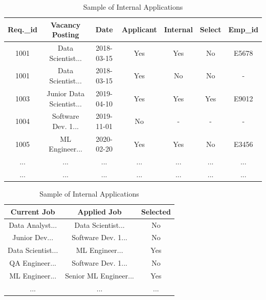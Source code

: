 \documentclass[12pt]{article}
\begin{document}
\begin{table}[ht]
\centering
\small
\caption{Sample of Internal Job Postings Data}
\label{tab:job_postings}
\begin{tabular}{|c|c|c|c|c|c|c|}
\hline
Req.\_id & Vacancy Posting & Date & Applicant & Internal & Select & Emp\_id \\
\hline
1001 & Data Scientist... & 2018-03-15 & Yes & Yes & No & E5678 \\
1001 & Data Scientist... & 2018-03-15 & Yes & No & No & - \\
1003 & Junior Data Scientist... & 2019-04-10 & Yes & Yes & Yes & E9012 \\
1004 & Software Dev. 1... & 2019-11-01 & No & - & - & - \\
1005 & ML Engineer... & 2020-02-20 & Yes & Yes & No & E3456 \\
\multicolumn{1}{|c|}{...} & \multicolumn{1}{c|}{...} & \multicolumn{1}{c|}{...} & \multicolumn{1}{c|}{...} & \multicolumn{1}{c|}{...} & \multicolumn{1}{c|}{...} & \multicolumn{1}{c|}{...} \\
\multicolumn{1}{|c|}{...} & \multicolumn{1}{c|}{...} & \multicolumn{1}{c|}{...} & \multicolumn{1}{c|}{...} & \multicolumn{1}{c|}{...} & \multicolumn{1}{c|}{...} & \multicolumn{1}{c|}{...} \\
\hline
\end{tabular}
\vspace{0.5cm}
\caption{Sample of Internal Applications}
\label{tab:job_transitions}
\begin{tabular}{|c|c|c|}
\hline
Current Job & Applied Job & Selected \\
\hline
Data Analyst... & Data Scientist... & No \\
Junior Dev... & Software Dev. 1... & No \\
Data Scientist... & ML Engineer... & Yes \\
QA Engineer... & Software Dev. 1... & No \\
ML Engineer... & Senior ML Engineer... & Yes \\
\multicolumn{1}{|c|}{...} & \multicolumn{1}{c|}{...} & \multicolumn{1}{c|}{...} \\
\hline
\end{tabular}
\end{table}
\end{document}
